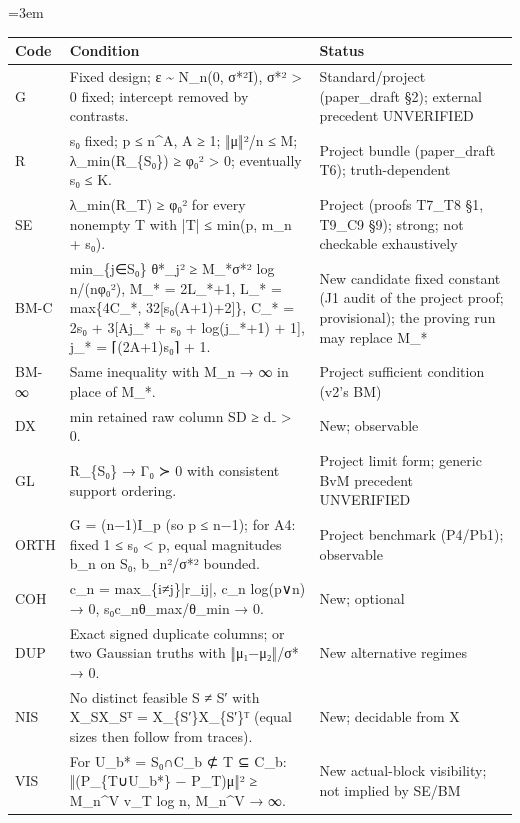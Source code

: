 \documentclass[11pt]{report}
\newenvironment{mdblock}{\begingroup\mdfont\raggedright\setlength{\parindent}{0pt}\setlength{\parskip}{0.55em}\emergencystretch=3em}{\par\endgroup}
\begin{document}
\begin{mdblock}
{\small
\begin{longtable}{|>{\raggedright\arraybackslash}p{}|>{\raggedright\arraybackslash}p{}|>{\raggedright\arraybackslash}p{}|}
\hline
\textbf{Code} & \textbf{Condition} & \textbf{Status} \\ \hline\endhead
G & Fixed design; ε \textasciitilde{} N\_n(0, σ*²I), σ*² > 0 fixed; intercept removed by contrasts. & Standard/project (paper\_draft §2); external precedent UNVERIFIED \\ \hline
R & s₀ fixed; p ≤ n\textasciicircum{}A, A ≥ 1; ‖μ‖²/n ≤ M; λ\_min(R\_\{S₀\}) ≥ φ₀² > 0; eventually s₀ ≤ K. & Project bundle (paper\_draft T6); truth-dependent \\ \hline
SE & λ\_min(R\_T) ≥ φ₀² for every nonempty T with |T| ≤ min(p, m\_n + s₀). & Project (proofs T7\_T8 §1, T9\_C9 §9); strong; not checkable exhaustively \\ \hline
BM-C & min\_\{j∈S₀\} θ*\_j² ≥ M\_*σ*² log n/(nφ₀²), M\_* = 2L\_*+1, L\_* = max\{4C\_*, 32[s₀(A+1)+2]\}, C\_* = 2s₀ + 3[Aj\_* + s₀ + log(j\_*+1) + 1], j\_* = ⌈(2A+1)s₀⌉ + 1. & New candidate fixed constant (J1 audit of the project proof; provisional); the proving run may replace M\_* \\ \hline
BM-∞ & Same inequality with M\_n → ∞ in place of M\_*. & Project sufficient condition (v2's BM) \\ \hline
DX & min retained raw column SD ≥ d₋ > 0. & New; observable \\ \hline
GL & R\_\{S₀\} → Γ₀ ≻ 0 with consistent support ordering. & Project limit form; generic BvM precedent UNVERIFIED \\ \hline
ORTH & G = (n−1)I\_p (so p ≤ n−1); for A4: fixed 1 ≤ s₀ < p, equal magnitudes b\_n on S₀, b\_n²/σ*² bounded. & Project benchmark (P4/Pb1); observable \\ \hline
COH & c\_n = max\_\{i≠j\}|r\_ij|, c\_n log(p∨n) → 0, s₀c\_nθ\_max/θ\_min → 0. & New; optional \\ \hline
DUP & Exact signed duplicate columns; or two Gaussian truths with ‖μ₁−μ₂‖/σ* → 0. & New alternative regimes \\ \hline
NIS & No distinct feasible S ≠ S′ with X\_SX\_Sᵀ = X\_\{S′\}X\_\{S′\}ᵀ (equal sizes then follow from traces). & New; decidable from X \\ \hline
VIS & For U\_b* = S₀∩C\_b ⊄ T ⊆ C\_b: ‖(P\_\{T∪U\_b*\} − P\_T)μ‖² ≥ M\_n\textasciicircum{}V v\_T log n, M\_n\textasciicircum{}V → ∞. & New actual-block visibility; not implied by SE/BM \\ \hline

\end{longtable}}
\end{mdblock}
\end{document}

